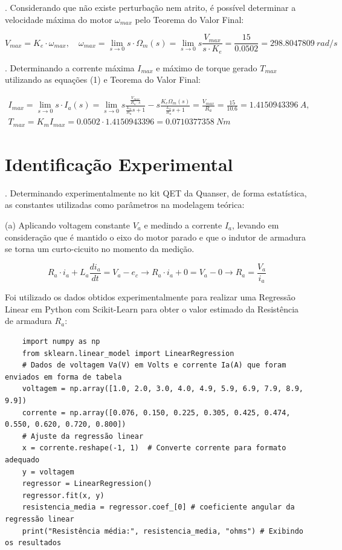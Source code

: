 \documentclass[10pt]{article}
\begin{document}
. Considerando que não existe perturbação nem atrito,
é possível determinar a velocidade máxima do motor $\omega_{max}$
pelo Teorema do Valor Final:

\begin{equation}
    V_{max} = K_e \cdot \omega_{max},
    \quad \omega_{max} = \lim_{s \rightarrow 0}s \cdot \Omega_m(s) = \lim_{s \rightarrow 0} s\frac{V_{max}}{s \cdot K_e} = \frac{15}{0.0502} = 298.8047809 \ rad/s
\end{equation}

. Determinando a corrente máxima $I_{max}$ e máximo de torque gerado $T_{max}$ utilizando as equações (1) e Teorema do Valor Final:

\begin{equation}
\begin{aligned}
    I_{max} = \lim_{s \rightarrow 0}s \cdot I_a(s)
    = \lim_{s \rightarrow 0} s\frac{\frac{V_{max}}{R_a \cdot s}}{\frac{L_a}{R_a}s+1}-s\frac{K_e \Omega_m(s)}{\frac{L_a}{R_a}s+1}
    = \frac{V_{max}}{R_a} = \frac{15}{10.6} = 1.4150943396 \ A, \\
    T_{max} = K_m I_{max} = 0.0502 \cdot 1.4150943396 = 0.0710377358 \ Nm
\end{aligned}
\end{equation}

\section{Identificação Experimental}

. Determinando experimentalmente no kit QET da Quanser, de forma estatística,
as constantes utilizadas como parâmetros na modelagem teórica:

\quad (a) Aplicando voltagem constante $V_a$ e medindo a corrente $I_a$,
levando em consideração que é mantido o eixo do motor parado
e que o indutor de armadura se torna um curto-cicuito no momento da medição.

\begin{equation}
    R_a \cdot i_a + L_a \frac{di_a}{dt} = V_a - e_c \rightarrow R_a \cdot i_a + 0 = V_a - 0 \rightarrow R_a = \frac{V_a}{i_a}
\end{equation}

\quad Foi utilizado os dados obtidos experimentalmente para realizar uma Regressão Linear em Python com Scikit-Learn
para obter o valor estimado da Resistência de armadura $R_a$:

\begin{verbatim}
    import numpy as np
    from sklearn.linear_model import LinearRegression
    # Dados de voltagem Va(V) em Volts e corrente Ia(A) que foram enviados em forma de tabela
    voltagem = np.array([1.0, 2.0, 3.0, 4.0, 4.9, 5.9, 6.9, 7.9, 8.9, 9.9])
    corrente = np.array([0.076, 0.150, 0.225, 0.305, 0.425, 0.474, 0.550, 0.620, 0.720, 0.800])
    # Ajuste da regressão linear
    x = corrente.reshape(-1, 1)  # Converte corrente para formato adequado
    y = voltagem
    regressor = LinearRegression()
    regressor.fit(x, y)
    resistencia_media = regressor.coef_[0] # coeficiente angular da regressão linear
    print("Resistência média:", resistencia_media, "ohms") # Exibindo os resultados
\end{verbatim}
\end{document}
